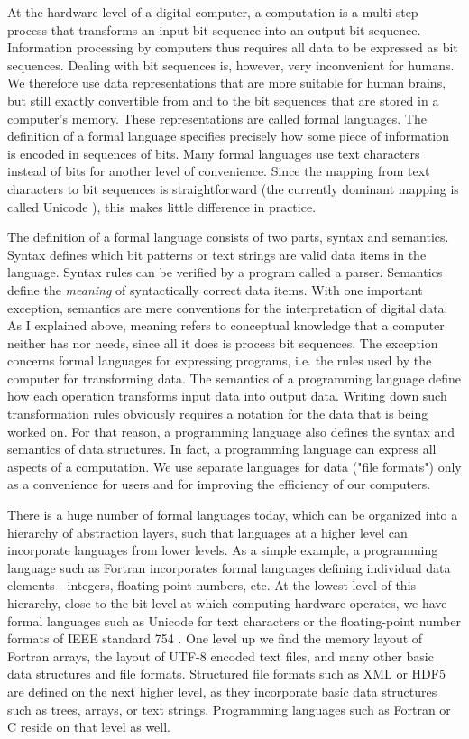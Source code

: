 At the hardware level of a digital computer, a computation is a multi-step process that transforms an input bit sequence into an output bit sequence. Information processing by computers thus requires all data to be expressed as bit sequences. Dealing with bit sequences is, however, very inconvenient for humans. We therefore use data representations that are more suitable for human brains, but still exactly convertible from and to the bit sequences that are stored in a computer's memory. These representations are called formal languages. The definition of a formal language specifies precisely how some piece of information is encoded in sequences of bits. Many formal languages use text characters instead of bits for another level of convenience. Since the mapping from text characters to bit sequences is straightforward (the currently dominant mapping is called Unicode \cite{_unicode_2015}), this makes little difference in practice.

The definition of a formal language consists of two parts, syntax and semantics. Syntax defines which bit patterns or text strings are valid data items in the language. Syntax rules can be verified by a program called a parser. Semantics define the \textit{meaning} of syntactically correct data items. With one important exception, semantics are mere conventions for the interpretation of digital data. As I explained above, meaning refers to conceptual knowledge that a computer neither has nor needs, since all it does is process bit sequences. The exception concerns formal languages for expressing programs, i.e. the rules used by the computer for transforming data. The semantics of a programming language define how each operation transforms input data into output data. Writing down such transformation rules obviously requires a notation for the data that is being worked on. For that reason, a programming language also defines the syntax and semantics of data structures. In fact, a programming language can express all aspects of a computation. We use separate languages for data ("file formats") only as a convenience for users and for improving the efficiency of our computers.

There is a huge number of formal languages today, which can be organized into a hierarchy of abstraction layers, such that languages at a higher level can incorporate languages from lower levels. As a simple example, a programming language such as Fortran incorporates formal languages defining individual data elements - integers, floating-point numbers, etc. At the lowest level of this hierarchy, close to the bit level at which computing hardware operates, we have formal languages such as Unicode \cite{_unicode_2015} for text characters or the floating-point number formats of IEEE standard 754 \cite{_ieee_2008}. One level up we find the memory layout of Fortran arrays, the layout of UTF-8 encoded text files, and many other basic data structures and file formats. Structured file formats such as XML \cite{_extensible_1998} or HDF5 \cite{hdf5} are defined on the next higher level, as they incorporate basic data structures such as trees, arrays, or text strings. Programming languages such as Fortran or C reside on that level as well.

